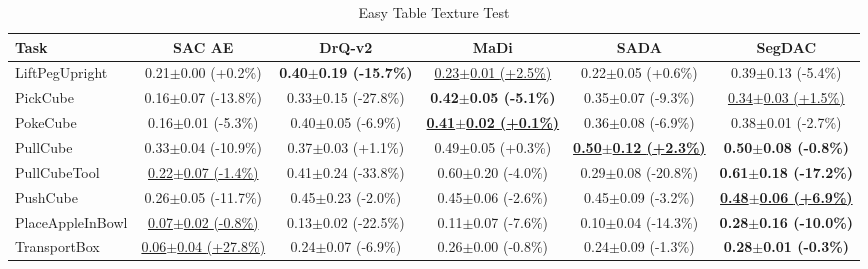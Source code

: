 \begin{table}[htbp]
\centering
\scriptsize
\caption{Easy Table Texture Test}
\label{tab:appendix_tabletexturetest_easy}
\begin{adjustbox}{max width=\textwidth}
\begin{tabular}{l*{5}{c}}
\toprule
\textbf{Task} & \textbf{SAC AE} & \textbf{DrQ-v2} & \textbf{MaDi} & \textbf{SADA} & \textbf{SegDAC} \\
\midrule
LiftPegUpright & 0.21$\pm$0.00 \scriptsize{(+0.2\%)} & \textbf{0.40$\pm$0.19 \scriptsize{(-15.7\%)}} & \underline{0.23$\pm$0.01 \scriptsize{(+2.5\%)}} & 0.22$\pm$0.05 \scriptsize{(+0.6\%)} & 0.39$\pm$0.13 \scriptsize{(-5.4\%)} \\
PickCube & 0.16$\pm$0.07 \scriptsize{(-13.8\%)} & 0.33$\pm$0.15 \scriptsize{(-27.8\%)} & \textbf{0.42$\pm$0.05 \scriptsize{(-5.1\%)}} & 0.35$\pm$0.07 \scriptsize{(-9.3\%)} & \underline{0.34$\pm$0.03 \scriptsize{(+1.5\%)}} \\
PokeCube & 0.16$\pm$0.01 \scriptsize{(-5.3\%)} & 0.40$\pm$0.05 \scriptsize{(-6.9\%)} & \textbf{\underline{0.41$\pm$0.02 \scriptsize{(+0.1\%)}}} & 0.36$\pm$0.08 \scriptsize{(-6.9\%)} & 0.38$\pm$0.01 \scriptsize{(-2.7\%)} \\
PullCube & 0.33$\pm$0.04 \scriptsize{(-10.9\%)} & 0.37$\pm$0.03 \scriptsize{(+1.1\%)} & 0.49$\pm$0.05 \scriptsize{(+0.3\%)} & \textbf{\underline{0.50$\pm$0.12 \scriptsize{(+2.3\%)}}} & \textbf{0.50$\pm$0.08 \scriptsize{(-0.8\%)}} \\
PullCubeTool & \underline{0.22$\pm$0.07 \scriptsize{(-1.4\%)}} & 0.41$\pm$0.24 \scriptsize{(-33.8\%)} & 0.60$\pm$0.20 \scriptsize{(-4.0\%)} & 0.29$\pm$0.08 \scriptsize{(-20.8\%)} & \textbf{0.61$\pm$0.18 \scriptsize{(-17.2\%)}} \\
PushCube & 0.26$\pm$0.05 \scriptsize{(-11.7\%)} & 0.45$\pm$0.23 \scriptsize{(-2.0\%)} & 0.45$\pm$0.06 \scriptsize{(-2.6\%)} & 0.45$\pm$0.09 \scriptsize{(-3.2\%)} & \textbf{\underline{0.48$\pm$0.06 \scriptsize{(+6.9\%)}}} \\
PlaceAppleInBowl & \underline{0.07$\pm$0.02 \scriptsize{(-0.8\%)}} & 0.13$\pm$0.02 \scriptsize{(-22.5\%)} & 0.11$\pm$0.07 \scriptsize{(-7.6\%)} & 0.10$\pm$0.04 \scriptsize{(-14.3\%)} & \textbf{0.28$\pm$0.16 \scriptsize{(-10.0\%)}} \\
TransportBox & \underline{0.06$\pm$0.04 \scriptsize{(+27.8\%)}} & 0.24$\pm$0.07 \scriptsize{(-6.9\%)} & 0.26$\pm$0.00 \scriptsize{(-0.8\%)} & 0.24$\pm$0.09 \scriptsize{(-1.3\%)} & \textbf{0.28$\pm$0.01 \scriptsize{(-0.3\%)}} \\
\bottomrule
\end{tabular}
\end{adjustbox}
\end{table}

